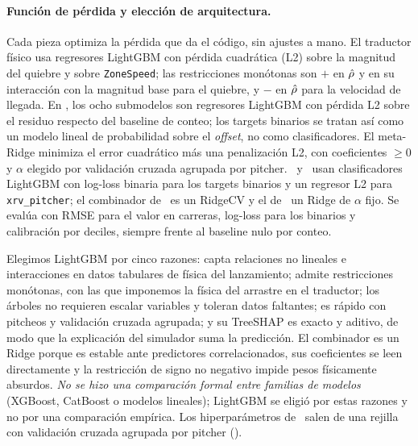 \documentclass[10pt]{article}
\begin{document}
\paragraph{Función de pérdida y elección de arquitectura.} Cada pieza optimiza la pérdida que da el código, sin ajustes a mano. El traductor físico usa regresores LightGBM con pérdida cuadrática (L2) sobre la magnitud del quiebre y sobre \texttt{ZoneSpeed}; las restricciones monótonas son $+$ en $\hat{\rho}$ y en su interacción con la magnitud base para el quiebre, y $-$ en $\hat{\rho}$ para la velocidad de llegada. En \splus, los ocho submodelos son regresores LightGBM con pérdida L2 sobre el residuo respecto del baseline de conteo; los targets binarios se tratan así como un modelo lineal de probabilidad sobre el \emph{offset}, no como clasificadores. El meta-Ridge minimiza el error cuadrático más una penalización L2, con coeficientes $\geq 0$ y $\alpha$ elegido por validación cruzada agrupada por pitcher. \lplus\ y \pplus\ usan clasificadores LightGBM con log-loss binaria para los targets binarios y un regresor L2 para \texttt{xrv\_pitcher}; el combinador de \lplus\ es un RidgeCV y el de \pplus\ un Ridge de $\alpha$ fijo. Se evalúa con RMSE para el valor en carreras, log-loss para los binarios y calibración por deciles, siempre frente al baseline nulo por conteo.

Elegimos LightGBM por cinco razones: capta relaciones no lineales e interacciones en datos tabulares de física del lanzamiento; admite restricciones monótonas, con las que imponemos la física del arrastre en el traductor; los árboles no requieren escalar variables y toleran datos faltantes; es rápido con  pitcheos y validación cruzada agrupada; y su TreeSHAP es exacto y aditivo, de modo que la explicación del simulador suma la predicción. El combinador es un Ridge porque es estable ante predictores correlacionados, sus coeficientes se leen directamente y la restricción de signo no negativo impide pesos físicamente absurdos. \emph{No se hizo una comparación formal entre familias de modelos} (XGBoost, CatBoost o modelos lineales); LightGBM se eligió por estas razones y no por una comparación empírica. Los hiperparámetros de \splus\ salen de una rejilla con validación cruzada agrupada por pitcher ().
\end{document}
